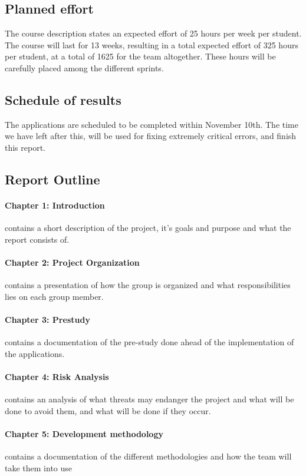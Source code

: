 \subsection{Planned effort}
The course description states an expected effort of 25 hours per week per student. The course will last for 13 weeks,
resulting in a total expected effort of 325 hours per student, at a total of 1625 for the team altogether. These hours will 
be carefully placed among the different sprints. 


\subsection{Schedule of results}
The applications are scheduled to be completed within November 10th. The time we have left after this, will be used for fixing
extremely critical errors, and finish this report.

\subsection{Report Outline}

\paragraph{Chapter 1: Introduction} contains a short description of the project, it's goals and purpose and what the report consists of.

\paragraph{Chapter 2: Project Organization} contains a presentation of how the group is organized and what responsibilities lies on each group member.

\paragraph{Chapter 3: Prestudy} contains a documentation of the pre-study done ahead of the implementation of the applications.

\paragraph{Chapter 4: Risk Analysis} contains an analysis of what threats may endanger the project and what will be done to avoid them, and what will be done if they occur.

\paragraph{Chapter 5: Development methodology} contains a documentation of the different methodologies and how the team will take them into use

